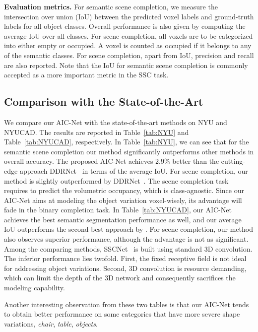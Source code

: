 \noindent
\textbf{Evaluation metrics.}
For semantic scene completion, we measure the intersection over union (IoU) between the predicted voxel labels and ground-truth labels for all object classes. 
Overall performance is also given by computing the average IoU over all classes. For scene completion, all voxels are to be categorized into either empty or occupied. A voxel is counted as occupied if it belongs to any of the semantic classes. For scene completion, apart from IoU, precision and recall are also reported. Note that the IoU for semantic scene completion is commonly accepted as a more important metric in the SSC task.  








\subsection{Comparison with the State-of-the-Art}
\vspace{-0.1cm}
We compare our AIC-Net with the state-of-the-art methods on NYU and NYUCAD. The results are reported in Table~\ref{tab:NYU} and Table~\ref{tab:NYUCAD}, respectively. In Table~\ref{tab:NYU}, we can see that for the semantic scene completion our method significantly outperforms other methods in overall accuracy.
The proposed AIC-Net achieves 2.9\% better than the cutting-edge approach DDRNet~\cite{li2019rgbd} in terms of the average IoU.
For scene completion, our method is slightly outperformed by DDRNet~\cite{li2019rgbd}. The scene completion task requires to predict the volumetric occupancy, which is class-agnostic. Since our AIC-Net aims at modeling the object variation voxel-wisely, its advantage will fade in the binary completion task.
In Table~\ref{tab:NYUCAD}, our AIC-Net achieves the best semantic segmentation performance as well, and our average IoU outperforms the second-best approach by . For scene completion, our method also observes superior performance, although the advantage is not as significant. 
Among the comparing methods, SSCNet~\cite{song2017_SSCNet} is built using standard 3D convolution. The inferior performance lies twofold. First, the fixed receptive field is not ideal for addressing object variations. Second, 3D convolution is resource demanding, which can limit the depth of the 3D network and consequently sacrifices the modeling capability.

Another interesting observation from these two tables is that our AIC-Net tends to obtain better performance on some categories that have more severe shape variations, \eg \emph{chair}, \emph{table}, \emph{objects}. 




